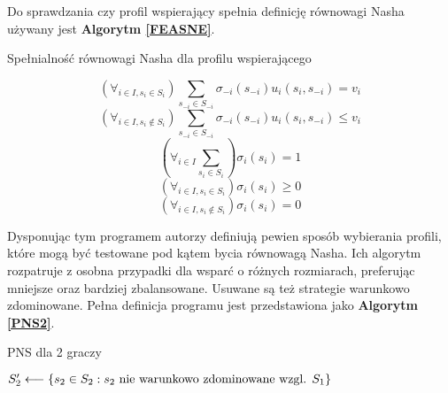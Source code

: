 \documentclass[polish]{standalone}
\begin{document}
Do sprawdzania czy profil wspierający spełnia definicję równowagi Nasha używany jest \textbf{Algorytm \ref{FEASNE}}.
\begin{algorithm}
\caption{Spełnialność równowagi Nasha dla profilu wspierającego}
\label{FEASNE}
\begin{algorithmic}
$$(\forall_{i \in I, s_i \in S_i}) \sum_{s_{-i} \in S_{-i}} \sigma_{-i}(s_{-i}) u_i(s_i, s_{-i}) = v_i$$
$$(\forall_{i \in I, s_i \not\in S_i}) \sum_{s_{-i} \in S_{-i}} \sigma_{-i}(s_{-i}) u_i(s_i, s_{-i}) \leq v_i$$
$$(\forall_{i \in I} \sum_{s_i \in S_i}) \sigma_i(s_i) = 1$$
$$(\forall_{i \in I, s_i \in S_i}) \sigma_i(s_i) \geq 0$$
$$(\forall_{i \in I, s_i \not\in S_i}) \sigma_i(s_i) = 0$$
\end{algorithmic}
\end{algorithm}

Dysponując tym programem autorzy definiują pewien sposób wybierania profili, które mogą być testowane pod kątem bycia
równowagą Nasha. Ich algorytm rozpatruje z osobna przypadki dla wsparć o różnych rozmiarach, preferując mniejsze oraz
bardziej zbalansowane. Usuwane są też strategie warunkowo zdominowane. Pełna definicja programu jest przedstawiona jako
\textbf{Algorytm \ref{PNS2}}.

\begin{algorithm}
\caption{PNS dla 2 graczy}
\label{PNS2}
\begin{algorithmic}
  \STATE $S_2' \longleftarrow \{ s_2 \in S_2: s_2 \textrm{ nie warunkowo zdominowane wzgl. } S_1 \}$
      \ENDIF
    \ENDIF
   \ENDFOR
  \ENDIF
 \ENDFOR
\ENDFOR
\end{algorithmic}
\end{algorithm}
\end{document}
